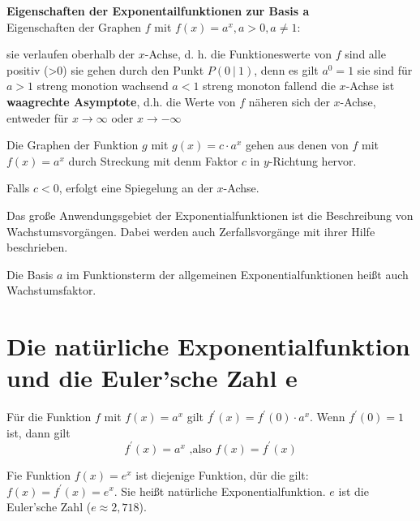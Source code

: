 \textbf{Eigenschaften der Exponentailfunktionen zur Basis a}\\
Eigenschaften der Graphen $f$ mit $f(x) = a^x, a>0, a\neq1$:
\begin{outline}
    \1 sie verlaufen oberhalb der $x$-Achse, d. h. die Funktioneswerte von $f$ sind alle positiv (>0) 
    \1 sie gehen durch den Punkt $P(0 \ | \ 1)$, denn es gilt $a^0 = 1$
    \1 sie sind für
    \2 $a>1$ streng monotion wachsend
    \2 $a<1$ streng monoton fallend
    \1 die $x$-Achse ist \textbf{waagrechte Asymptote}, d.h. die Werte von $f$ näheren sich der $x$-Achse, entweder für $x \to \infty$ oder $x \to -\infty$
\end{outline}
Die Graphen der Funktion $g$ mit $g(x) = c\cdot a^x$ gehen aus denen von $f$ mit $f(x)=a^x$ durch Streckung mit denm Faktor $c$ in $y$-Richtung hervor.

Falls $c<0$, erfolgt eine Spiegelung an der $x$-Achse.

Das große Anwendungsgebiet der Exponentialfunktionen ist die Beschreibung von Wachstumsvorgängen. Dabei werden auch Zerfallsvorgänge mit ihrer Hilfe beschrieben.

Die Basis $a$ im Funktionsterm der allgemeinen Exponentialfunktionen heißt auch Wachstumsfaktor.

\section{Die natürliche Exponentialfunktion und die Euler'sche Zahl e}

\begin{satz}
    Für die Funktion $f$ mit $f(x) = a^x$ gilt $f^\prime(x) = f^\prime(0) \cdot a^x$. Wenn $f^\prime(0) = 1$ ist, dann gilt $$f^\prime(x) = a^x \text{ ,also } f(x) = f^\prime(x)$$
\end{satz}

\begin{satz}
    Fie Funktion $f(x) = e^x$ ist diejenige Funktion, dür die gilt: $f(x) = f^\prime(x) = e^x$. Sie heißt natürliche Exponentialfunktion. $e$ ist die Euler'sche Zahl ($e \approx 2,718$).
\end{satz}

\ \\
\ \\

